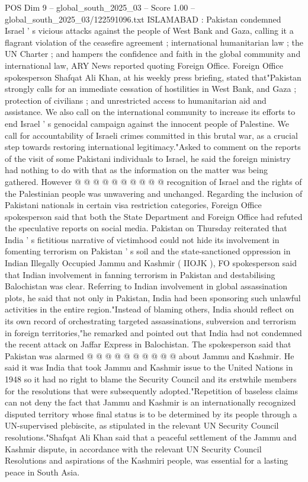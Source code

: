 \begin{textsample}{POS Dim 9 – global\_south\_2025\_03 – Score 1.00 – global\_south\_2025\_03/122591096.txt}  \label{ex:f9_pos_139}
ISLAMABAD : Pakistan condemned Israel ' s vicious attacks against the people of West Bank and Gaza, calling it a flagrant violation of the ceasefire agreement ; international humanitarian law ; the UN Charter ; and hampers the confidence and faith in the global community and international law, ARY News reported quoting Foreign Office.
Foreign Office spokesperson Shafqat Ali Khan, at his weekly press briefing, stated that"Pakistan strongly calls for an immediate cessation of hostilities in West Bank, and Gaza ; protection of civilians ; and unrestricted access to humanitarian aid and assistance.
We also call on the international community to increase its efforts to end Israel ' s genocidal campaign against the innocent people of Palestine.
We call for accountability of Israeli crimes committed in this brutal war, as a crucial step towards restoring international legitimacy."Asked to comment on the reports of the visit of some Pakistani individuals to Israel, he said the foreign ministry had nothing to do with that as the information on the matter was being gathered.
However @ @ @ @ @ @ @ @ @ @ recognition of Israel and the rights of the Palestinian people was unwavering and unchanged.
Regarding the inclusion of Pakistani nationals in certain visa restriction categories, Foreign Office spokesperson said that both the State Department and Foreign Office had refuted the speculative reports on social media.
Pakistan on Thursday reiterated that India ' s fictitious narrative of victimhood could not hide its involvement in fomenting terrorism on Pakistan ' s soil and the state-sanctioned oppression in Indian Illegally Occupied Jammu and Kashmir ( IIOJK ), FO spokesperson said that Indian involvement in fanning terrorism in Pakistan and destabilising Balochistan was clear.
Referring to Indian involvement in global assassination plots, he said that not only in Pakistan, India had been sponsoring such unlawful activities in the entire region."Instead of blaming others, India should reflect on its own record of orchestrating targeted assassinations, subversion and terrorism in foreign territories,"he remarked and pointed out that India had not condemned the recent attack on Jaffar Express in Balochistan.
The spokesperson said that Pakistan was alarmed @ @ @ @ @ @ @ @ @ @ about Jammu and Kashmir.
He said it was India that took Jammu and Kashmir issue to the United Nations in 1948 so it had no right to blame the Security Council and its erstwhile members for the resolutions that were subsequently adopted."Repetition of baseless claims can not deny the fact that Jammu and Kashmir is an internationally recognized disputed territory whose final status is to be determined by its people through a UN-supervised plebiscite, as stipulated in the relevant UN Security Council resolutions."Shafqat Ali Khan said that a peaceful settlement of the Jammu and Kashmir dispute, in accordance with the relevant UN Security Council Resolutions and aspirations of the Kashmiri people, was essential for a lasting peace in South Asia.

\end{textsample}
